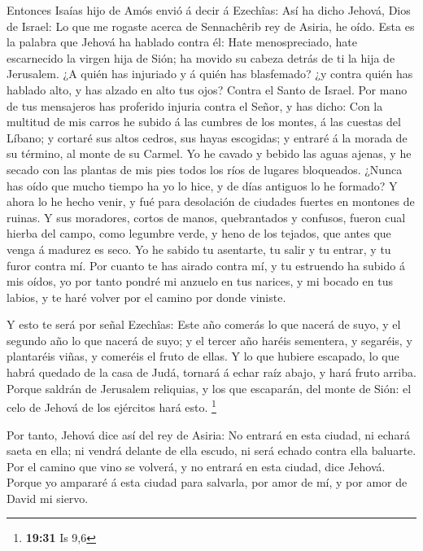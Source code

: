  Entonces Isaías hijo de Amós envió á decir á Ezechîas: Así
ha dicho Jehová, Dios de Israel: Lo que me rogaste acerca de Sennachêrib
rey de Asiria, he oído.  Esta es la palabra que Jehová ha
hablado contra él: Hate menospreciado, hate escarnecido la virgen hija
de Sión; ha movido su cabeza detrás de ti la hija de Jerusalem.
 ¿A quién has injuriado y á quién has blasfemado? ¿y contra
quién has hablado alto, y has alzado en alto tus ojos? Contra el Santo
de Israel.  Por mano de tus mensajeros has proferido
injuria contra el Señor, y has dicho: Con la multitud de mis carros he
subido á las cumbres de los montes, á las cuestas del Líbano; y cortaré
sus altos cedros, sus hayas escogidas; y entraré á la morada de su
término, al monte de su Carmel.  Yo he cavado y bebido las
aguas ajenas, y he secado con las plantas de mis pies todos los ríos de
lugares bloqueados.  ¿Nunca has oído que mucho tiempo ha yo
lo hice, y de días antiguos lo he formado? Y ahora lo he hecho venir, y
fué para desolación de ciudades fuertes en montones de ruinas.
 Y sus moradores, cortos de manos, quebrantados y confusos,
fueron cual hierba del campo, como legumbre verde, y heno de los
tejados, que antes que venga á madurez es seco.  Yo he
sabido tu asentarte, tu salir y tu entrar, y tu furor contra mí.
 Por cuanto te has airado contra mí, y tu estruendo ha
subido á mis oídos, yo por tanto pondré mi anzuelo en tus narices, y mi
bocado en tus labios, y te haré volver por el camino por donde viniste.

 Y esto te será por señal Ezechîas: Este año comerás lo que
nacerá de suyo, y el segundo año lo que nacerá de suyo; y el tercer año
haréis sementera, y segaréis, y plantaréis viñas, y comeréis el fruto de
ellas.  Y lo que hubiere escapado, lo que habrá quedado de
la casa de Judá, tornará á echar raíz abajo, y hará fruto arriba.
 Porque saldrán de Jerusalem reliquias, y los que
escaparán, del monte de Sión: el celo de Jehová de los ejércitos hará
esto. \footnote{\textbf{19:31} Is 9,6}

 Por tanto, Jehová dice así del rey de Asiria: No entrará
en esta ciudad, ni echará saeta en ella; ni vendrá delante de ella
escudo, ni será echado contra ella baluarte.  Por el camino
que vino se volverá, y no entrará en esta ciudad, dice Jehová.
 Porque yo ampararé á esta ciudad para salvarla, por amor
de mí, y por amor de David mi siervo.


